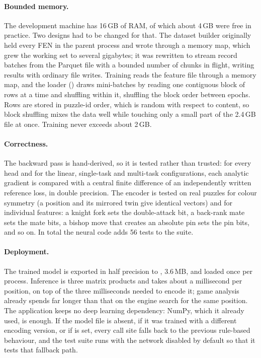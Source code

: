 \paragraph{Bounded memory.} The development machine has 16\,GB of RAM, of which about 4\,GB were free
in practice. Two designs had to be changed for that. The dataset builder originally held every FEN in
the parent process and wrote through a memory map, which grew the working set to several gigabytes; it
was rewritten to stream record batches from the Parquet file with a bounded number of chunks in
flight, writing results with ordinary file writes. Training reads the feature file through a memory
map, and the loader () draws mini-batches by reading one contiguous block of rows at
a time and shuffling within it, shuffling the block order between epochs. Rows are stored in puzzle-id
order, which is random with respect to content, so block shuffling mixes the data well while touching
only a small part of the 2.4\,GB file at once. Training never exceeds about 2\,GB.

\paragraph{Correctness.} The backward pass is hand-derived, so it is tested rather than trusted: for
every head and for the linear, single-task and multi-task configurations, each analytic gradient is
compared with a central finite difference of an independently written reference loss, in double
precision. The encoder is tested on real puzzles for colour symmetry (a position and its mirrored twin
give identical vectors) and for individual features: a knight fork sets the double-attack bit, a
back-rank mate sets the mate bits, a bishop move that creates an absolute pin sets the pin bits, and
so on. In total the neural code adds 56 tests to the suite.

\paragraph{Deployment.} The trained model is exported in half precision to
, 3.6\,MB, and loaded once per process. Inference is three matrix
products and takes about a millisecond per position, on top of the three milliseconds needed to encode
it; game analysis already spends far longer than that on the engine search for the same position. The
application keeps no deep learning dependency: NumPy, which it already used, is enough. If the model
file is absent, if it was trained with a different encoding version, or if  is
set, every call site falls back to the previous rule-based behaviour, and the test suite runs with the
network disabled by default so that it tests that fallback path.
